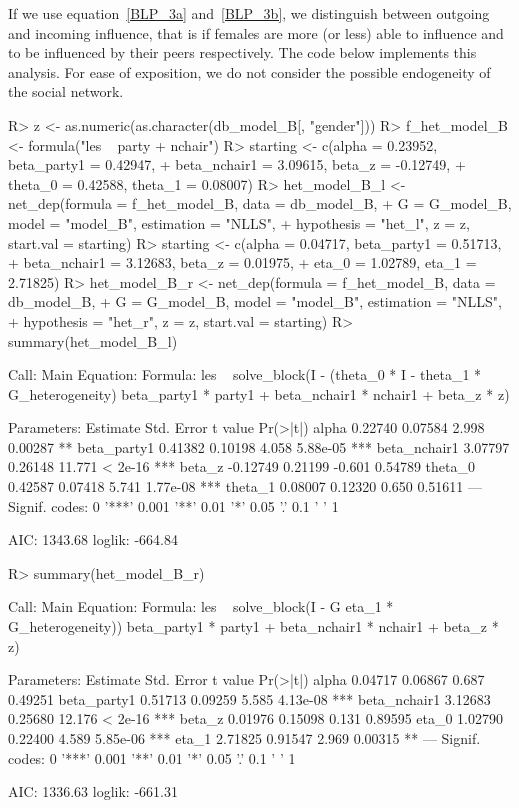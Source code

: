 \documentclass[nojss]{jss}
\begin{document}
If we use equation~\ref{BLP_3a} and~\ref{BLP_3b}, we distinguish between outgoing and incoming influence, that is if females are more (or less) able to influence and to be influenced by their peers respectively. The code below implements this analysis. For ease of exposition, we do not consider the possible endogeneity of the social network.
\begin{CodeChunk}
\begin{CodeInput}
R> z <- as.numeric(as.character(db_model_B[, "gender"]))
R> f_het_model_B <- formula("les ~ party + nchair")
R> starting <- c(alpha = 0.23952, beta_party1 = 0.42947,
+    beta_nchair1 = 3.09615, beta_z = -0.12749,
+    theta_0 = 0.42588, theta_1 = 0.08007)
R> het_model_B_l <- net_dep(formula = f_het_model_B, data = db_model_B,
+    G = G_model_B, model = "model_B", estimation = "NLLS",
+    hypothesis = "het_l", z = z, start.val = starting)
R> starting <- c(alpha = 0.04717, beta_party1 = 0.51713,
+    beta_nchair1 = 3.12683, beta_z = 0.01975,
+    eta_0 = 1.02789, eta_1 = 2.71825)
R> het_model_B_r <- net_dep(formula = f_het_model_B, data = db_model_B,
+    G = G_model_B, model = "model_B", estimation = "NLLS",
+    hypothesis = "het_r", z = z, start.val = starting)
R> summary(het_model_B_l)
\end{CodeInput}
\begin{CodeOutput}
Call:
Main Equation:  
Formula: les ~ solve_block(I - (theta_0 * I - 
theta_1 * G_heterogeneity) %
beta_party1 * party1 + beta_nchair1 * nchair1 + beta_z * z)

Parameters:
Estimate Std. Error t value Pr(>|t|)    
alpha         0.22740    0.07584   2.998  0.00287 ** 
beta_party1   0.41382    0.10198   4.058 5.88e-05 ***
beta_nchair1  3.07797    0.26148  11.771  < 2e-16 ***
beta_z       -0.12749    0.21199  -0.601  0.54789    
theta_0       0.42587    0.07418   5.741 1.77e-08 ***
theta_1       0.08007    0.12320   0.650  0.51611    
---
Signif. codes:  0 '***' 0.001 '**' 0.01 '*' 0.05 '.' 0.1 ' ' 1

AIC: 1343.68  loglik: -664.84
\end{CodeOutput}
\begin{CodeInput}
R> summary(het_model_B_r)
\end{CodeInput}
\begin{CodeOutput}
Call:
Main Equation:  
Formula: les ~ solve_block(I - G %
eta_1 * G_heterogeneity)) %
beta_party1 * party1 + beta_nchair1 * nchair1 + beta_z * z)

Parameters:
Estimate Std. Error t value Pr(>|t|)    
alpha         0.04717    0.06867   0.687  0.49251    
beta_party1   0.51713    0.09259   5.585 4.13e-08 ***
beta_nchair1  3.12683    0.25680  12.176  < 2e-16 ***
beta_z        0.01976    0.15098   0.131  0.89595    
eta_0         1.02790    0.22400   4.589 5.85e-06 ***
eta_1         2.71825    0.91547   2.969  0.00315 ** 
---
Signif. codes:  0 '***' 0.001 '**' 0.01 '*' 0.05 '.' 0.1 ' ' 1

AIC: 1336.63  loglik: -661.31
\end{CodeOutput}
\end{CodeChunk}
\end{document}
